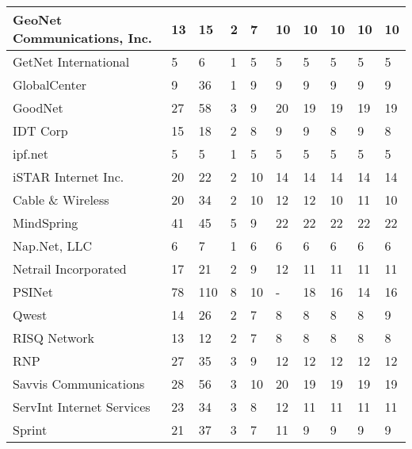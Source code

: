 \documentclass [12pt]{article}
\begin{document}
\begin{table}[H]
{\begin{tabular}{ | l | l | l | l | l | l | l | l | l | l | }
      GeoNet Communications, Inc. & 13  & 15  & 2   & 7   &  10  &  10      &    10   &   10    &  10 \\ \hline
      GetNet International        & 5   & 6   & 1   & 5   &  5   &  5       &    5    &   5     &  5  \\ \hline
      GlobalCenter                & 9   & 36  & 1   & 9   &  9   &  9       &    9    &   9     &  9  \\ \hline
      GoodNet                     & 27  & 58  & 3   & 9   &  20  &  19      &    19   &   19    &  19 \\ \hline
      IDT Corp                    & 15  & 18  & 2   & 8   &  9   &  9       &    8    &   9     &  8  \\ \hline
      ipf.net                     & 5   & 5   & 1   & 5   &  5   &  5       &    5    &   5     &  5  \\ \hline
      iSTAR Internet Inc.         & 20  & 22  & 2   & 10  &  14  &  14      &    14   &   14    &  14 \\ \hline
      Cable \& Wireless           & 20  & 34  & 2   & 10  &  12  &  12      &    10   &   11    &  10 \\ \hline
      MindSpring                  & 41  & 45  & 5   & 9   &  22  &  22      &    22   &   22    &  22 \\ \hline
      Nap.Net, LLC                & 6   & 7   & 1   & 6   &  6   &  6       &    6    &   6     &  6  \\ \hline
      Netrail Incorporated        & 17  & 21  & 2   & 9   &  12  &  11      &    11   &   11    &  11 \\ \hline
      PSINet                      & 78  & 110 & 8   & 10  &   -  &  18      &    16   &   14    &  16 \\ \hline
      Qwest                       & 14  & 26  & 2   & 7   &   8  &  8       &    8    &   8     &  9  \\ \hline
      RISQ Network                & 13  & 12  & 2   & 7   &   8  &  8       &    8    &   8     &  8  \\ \hline
      RNP                         & 27  & 35  & 3   & 9   &   12 &  12      &    12   &   12    &  12 \\ \hline
      Savvis Communications       & 28  & 56  & 3   & 10  &   20 &  19      &    19   &   19    &  19 \\ \hline
      ServInt Internet Services   & 23  & 34  & 3   & 8   &   12 &  11      &    11   &   11    &  11 \\ \hline
      Sprint                      & 21  & 37  & 3   & 7   &   11 &  9       &    9    &   9     &  9  \\ \hline

\end{tabular}}
\end{table}
\end{document}
